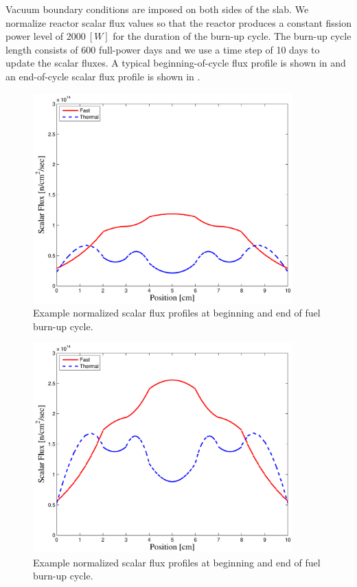 Vacuum boundary conditions are imposed on both sides of the slab.  
We normalize reactor scalar flux values so that the reactor produces a constant fission power level of $2000~[W]$ for the duration of the burn-up cycle.
The burn-up cycle length consists of 600 full-power days and we use a time step of 10 days to update the scalar fluxes.
A typical beginning-of-cycle flux profile is shown in  and an end-of-cycle scalar flux profile is shown in .  
\begin{figure}[!htp]
\centering
\includegraphics[width=10cm]{chapter5_depletion/P1_Lobatto_full_80_cells_t_steps60_End_600_Power_2000__BOC_Flux.pdf}
\caption{Example normalized scalar flux profiles at beginning and end of fuel burn-up cycle.}
\label{fig:ex_boc_cycle}
\end{figure}

\begin{figure}[!hbp]
\centering
\includegraphics[width=10cm]{chapter5_depletion/P1_Lobatto_full_80_cells_t_steps60_End_600_Power_2000__EOC_Flux.pdf}
\caption{Example normalized scalar flux profiles at beginning and end of fuel burn-up cycle.}
\label{fig:ex_eoc_cycle}
\end{figure}

